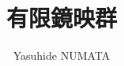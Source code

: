 \documentclass[tombow,dvipdfmx]{jsbook}
\theoremstyle{plain}
\theoremstyle{remark}
\theoremstyle{definition}
\begin{document}
\title{有限鏡映群}

\author{Yasuhide NUMATA}



\maketitle



\appendix



\end{document}
